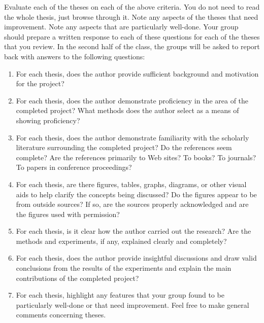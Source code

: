 Evaluate each of the theses on each of the above criteria. You do not need to read the whole thesis, just browse through it. Note any
aspects of the theses that need improvement. Note any aspects that
are particularly well-done. Your group should prepare a written response to each of these questions for each of the
theses that you review. In the second half of the class, the groups will be asked
to report back with answers to the following questions:
\begin{enumerate}
\item
For each thesis, does the author provide sufficient background
and motivation for the project?
\item
For each thesis, does the author demonstrate proficiency in the area
of the completed project? What methods does the author select as a means of showing proficiency?
\item
For each thesis, does the author demonstrate familiarity with the
scholarly literature surrounding the completed project? Do the
references seem complete? Are the references primarily to Web sites? To
books? To journals? To papers in conference proceedings?
\item
For each thesis, are there figures, tables, graphs, diagrams, or other
visual aids to help clarify the concepts being discussed? Do the
figures appear to be from outside sources? If so, are the
sources properly acknowledged and are the figures used with permission?
\item
For each thesis, is it clear how the author carried out
the research? Are the methods and experiments, if any, explained clearly and completely?
\item
For each thesis, does the author provide insightful discussions and draw valid conclusions from the results of the
experiments and explain the main contributions of the completed project?
\item
For each thesis, highlight any features that your group found to be
particularly well-done or that need improvement.
Feel free to make general comments concerning theses.
\end{enumerate}




